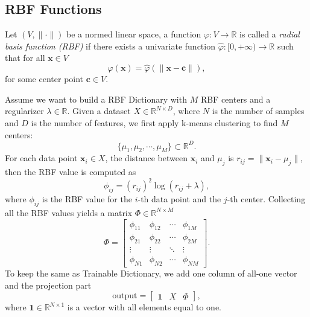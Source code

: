 \documentclass[en, bibend=bibtex]{elegantpaper}
\theoremstyle{plain}
\begin{document}
\subsection{RBF Functions}

\begin{definition}
  Let $(V, \|\cdot\|)$ be a normed linear space,
  a function $\varphi: V \rightarrow \mathbb{R}$ is called
  a \emph{radial basis function (RBF)} if
  there exists a univariate function $\hat{\varphi}: [0, +\infty) \rightarrow \mathbb{R}$
  such that for all $\mathbf{x} \in V$
  \begin{equation*}
   \varphi(\mathbf{x}) = \hat{\varphi}(\|\mathbf{x} - \mathbf{c}\|),
  \end{equation*}
  for some center point $\mathbf{c} \in V$.
\end{definition}

Assume we want to build a RBF Dictionary
with $M$ RBF centers and a regularizer $\lambda \in \mathbb{R}$.
Given a dataset $X \in \mathbb{R}^{N \times D}$,
where $N$ is the number of samples and
$D$ is the number of features,
we first apply k-means clustering to find $M$ centers:
\begin{equation*}
  \{\mu_1, \mu_2, \cdots, \mu_M\} \subset \mathbb{R}^D.
\end{equation*}
For each data point $\mathbf{x}_i \in X$,
the distance between $\mathbf{x}_i$ and $\mu_j$ is
$r_{ij} = \|\mathbf{x}_i - \mu_j\|$,
then the RBF value is computed as
\begin{equation*}
  \phi_{ij} = (r_{ij})^2 \log(r_{ij} + \lambda),
\end{equation*}
where $\phi_{ij}$ is the RBF value for the
$i$-th data point and the $j$-th center.
Collecting all the RBF values yields a matrix $\Phi \in \mathbb{R}^{N \times M}$
\begin{equation*}
  \Phi = \left[
    \begin{array}{cccc}
      \phi_{11}&\phi_{12}&\cdots&\phi_{1M}\\
      \phi_{21}&\phi_{22}&\cdots&\phi_{2M}\\
      \vdots & \vdots & \ddots & \vdots\\
      \phi_{N1}&\phi_{N2}&\cdots&\phi_{NM}
    \end{array}
  \right].
\end{equation*}
To keep the same as Trainable Dictionary,
we add one column of all-one vector and
the projection part
\begin{equation*}
  \text{output} = \left[
    \begin{array}{ccc}
      \mathbf{1}&X&\Phi
    \end{array}
  \right],
\end{equation*}
where $\mathbf{1} \in \mathbb{R}^{N\times 1}$ is a vector with all elements
equal to one.
\end{document}
